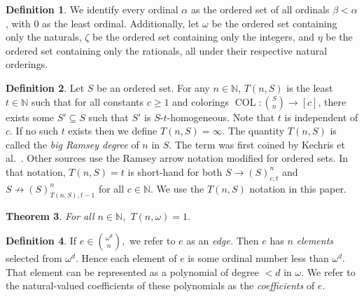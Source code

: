 \documentclass[10pt,a4paper]{article}
\newcommand{\om}{\omega}
\newcommand{\oequiv}{\approx}
\newcommand{\COL}{\operatorname{COL}}
\newcommand{\N}{\mathbb{N}}
\newcommand{\numpoints}{n}
\newcommand{\numcolors}{c}
\theoremstyle{plain}
\newtheorem{theorem}{Theorem}[section]
\theoremstyle{definition}
\newtheorem{definition}[theorem]{Definition}
\begin{document}
\begin{definition}
We identify every ordinal $\alpha$ as the ordered set of all ordinals $\beta < \alpha$, with 0 as the least ordinal. Additionally, let $\omega$ be the ordered set containing only the naturals, $\zeta$ be the ordered set containing only the integers, and $\eta$ be the ordered set containing only the rationals, all under their respective natural orderings.

\end{definition}

\begin{definition}\label{def:T}
Let $S$ be an ordered set.
For any $\numpoints\in \N$, $T(\numpoints,S)$
is the least $t\in \N$ such that for all constants $\numcolors \geq 1$ and
colorings  $\COL \colon \binom{S}{\numpoints} \to [\numcolors]$, there exists some $S' \subseteq S$ 
such that $S'$ is $S$-$t$-homogeneous.
Note that $t$ is independent of $\numcolors$.
If no such $t$ exists then we define $T(\numpoints,S)=\infty$. 
The quantity $T(\numpoints,S)$ is called the \textit{big Ramsey degree} of $\numpoints$ in $S$.
The term was first coined by Kechris et al.~\cite{KPT-2005}. Other sources use the Ramsey arrow notation modified for ordered sets. In that notation, $T(\numpoints,S)=t$ is short-hand for both
$S \to (S)^{\numpoints}_{\numcolors,t}$ and $S \not \to
(S)^{\numpoints}_{T(\numpoints,S),t-1}$ for all $\numcolors \in \N.$
We use the $T(n, S)$ notation in this paper.
\end{definition}

\begin{theorem}\label{th:ramsey}
For all $\numpoints \in \N,$
$T(\numpoints,\omega)=1.$
\end{theorem}

\begin{definition} \label{def:coef}
If $e \in \binom{\om^d}{n},$ we refer to $e$ as an {\it edge.} Then $e$ has $n$ {\it elements} selected from $\om^d.$
Hence each element of $e$ is some ordinal number less than $\om^d.$ That element can be represented as a polynomial of degree $< d$ in $\omega.$ We refer to the natural-valued coefficients of these polynomials as the {\it coefficients} of $e.$
\end{definition}
\end{document}
